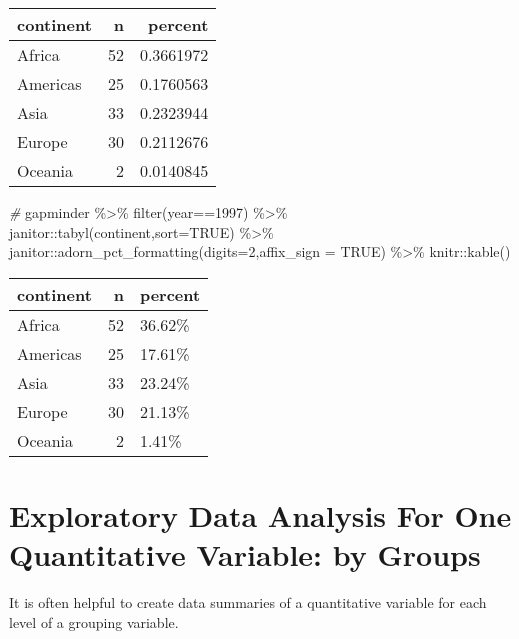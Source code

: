 \documentclass[
]{book}
\newenvironment{Shaded}{\begin{snugshade}}{\end{snugshade}}
\newcommand{\AttributeTok}[1]{\textcolor[rgb]{0.77,0.63,0.00}{#1}}
\newcommand{\CommentTok}[1]{\textcolor[rgb]{0.56,0.35,0.01}{\textit{#1}}}
\newcommand{\ConstantTok}[1]{\textcolor[rgb]{0.00,0.00,0.00}{#1}}
\newcommand{\DecValTok}[1]{\textcolor[rgb]{0.00,0.00,0.81}{#1}}
\newcommand{\FunctionTok}[1]{\textcolor[rgb]{0.00,0.00,0.00}{#1}}
\newcommand{\NormalTok}[1]{#1}
\newcommand{\SpecialCharTok}[1]{\textcolor[rgb]{0.00,0.00,0.00}{#1}}
\begin{document}
\begin{tabular}{l|r|r}
\hline
continent & n & percent\\
\hline
Africa & 52 & 0.3661972\\
\hline
Americas & 25 & 0.1760563\\
\hline
Asia & 33 & 0.2323944\\
\hline
Europe & 30 & 0.2112676\\
\hline
Oceania & 2 & 0.0140845\\
\hline
\end{tabular}

\begin{Shaded}
\begin{Highlighting}[]
\CommentTok{\#}
\NormalTok{gapminder }\SpecialCharTok{\%\textgreater{}\%} 
  \FunctionTok{filter}\NormalTok{(year}\SpecialCharTok{==}\DecValTok{1997}\NormalTok{) }\SpecialCharTok{\%\textgreater{}\%}
\NormalTok{  janitor}\SpecialCharTok{::}\FunctionTok{tabyl}\NormalTok{(continent,}\AttributeTok{sort=}\ConstantTok{TRUE}\NormalTok{) }\SpecialCharTok{\%\textgreater{}\%}
\NormalTok{  janitor}\SpecialCharTok{::}\FunctionTok{adorn\_pct\_formatting}\NormalTok{(}\AttributeTok{digits=}\DecValTok{2}\NormalTok{,}\AttributeTok{affix\_sign =} \ConstantTok{TRUE}\NormalTok{) }\SpecialCharTok{\%\textgreater{}\%}
\NormalTok{  knitr}\SpecialCharTok{::}\FunctionTok{kable}\NormalTok{()}
\end{Highlighting}
\end{Shaded}

\begin{tabular}{l|r|l}
\hline
continent & n & percent\\
\hline
Africa & 52 & 36.62\%\\
\hline
Americas & 25 & 17.61\%\\
\hline
Asia & 33 & 23.24\%\\
\hline
Europe & 30 & 21.13\%\\
\hline
Oceania & 2 & 1.41\%\\
\hline
\end{tabular}

\hypertarget{exploratory-data-analysis-for-one-quantitative-variable-by-groups}{%
\chapter{Exploratory Data Analysis For One Quantitative Variable: by Groups}\label{exploratory-data-analysis-for-one-quantitative-variable-by-groups}}

It is often helpful to create data summaries of a quantitative variable for each level of a grouping variable.
\end{document}
